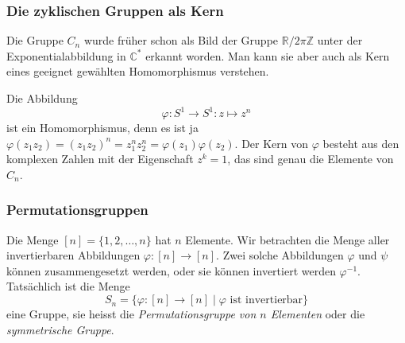 %
%
\subsubsection{Die zyklischen Gruppen als Kern}
Die Gruppe $C_n$ wurde früher schon als Bild der Gruppe
$\mathbb{R}/2\pi\mathbb{Z}$ unter der Exponentialabbildung 
in $\mathbb{C}^*$ erkannt worden.
Man kann sie aber auch als Kern eines geeignet gewählten Homomorphismus
verstehen.

Die Abbildung
\[
\varphi
\colon
S^1\to S^1
:
z\mapsto z^n
\]
ist ein Homomorphismus, denn es ist ja $\varphi(z_1z_2)=(z_1z_2)^n
= z_1^nz_2^n=\varphi(z_1)\varphi(z_2)$.
Der Kern von $\varphi$ besteht aus den komplexen Zahlen mit der 
Eigenschaft $z^k=1$, das sind genau die Elemente von $C_n$.

%
%
\subsubsection{Permutationsgruppen}
Die Menge $[n]=\{1,2,\dots,n\}$ hat $n$ Elemente.
Wir betrachten die Menge aller invertierbaren Abbildungen
$\varphi\colon [n] \to [n]$.
Zwei solche Abbildungen $\varphi$ und $\psi$ können zusammengesetzt
werden, oder sie können invertiert werden $\varphi^{-1}$.
Tatsächlich ist die Menge 
\[
S_n = \{\varphi\colon [n] \to [n]\mid \text{$\varphi$ ist invertierbar} \}
\]
eine Gruppe, sie heisst die {\em Permutationsgruppe von $n$ Elementen}
oder die {\em symmetrische Gruppe}.

